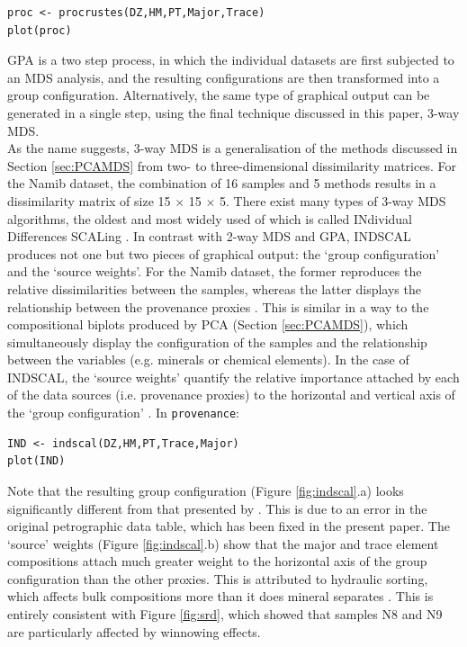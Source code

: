 \documentclass{article}
\begin{document}
\begin{verbatim}
proc <- procrustes(DZ,HM,PT,Major,Trace)
plot(proc)
\end{verbatim}

GPA is a two step process, in which the individual datasets are first
subjected to an MDS analysis, and the resulting configurations are
then transformed into a group configuration. Alternatively, the same
type of graphical output can be generated in a single step, using the
final technique discussed in this paper, 3-way MDS.\\

As the name suggests, 3-way MDS is a generalisation of the methods
discussed in Section \ref{sec:PCAMDS} from two- to three-dimensional
dissimilarity matrices.  For the Namib dataset, the combination of 16
samples and 5 methods results in a dissimilarity matrix of size 15
$\times$ 15 $\times$ 5. There exist many types of 3-way MDS
algorithms, the oldest and most widely used of which is called
INdividual Differences SCALing \citep[INDSCAL,][]{carroll1970}. In
contrast with 2-way MDS and GPA, INDSCAL produces not one but two
pieces of graphical output: the `group configuration' and the `source
weights'. For the Namib dataset, the former reproduces the relative
dissimilarities between the samples, whereas the latter displays the
relationship between the provenance proxies
\citep{vermeesch2015}. This is similar in a way to the compositional
biplots produced by PCA (Section \ref{sec:PCAMDS}), which
simultaneously display the configuration of the samples and the
relationship between the variables (e.g. minerals or chemical
elements).  In the case of INDSCAL, the `source weights' quantify the
relative importance attached by each of the data sources
(i.e. provenance proxies) to the horizontal and vertical axis of the
`group configuration' \citep{carroll1970, deleeuw2011, vermeesch2015}.
In {\tt provenance}:

\begin{verbatim}
IND <- indscal(DZ,HM,PT,Trace,Major)
plot(IND) 
\end{verbatim}

Note that the resulting group configuration (Figure
\ref{fig:indscal}.a) looks significantly different from that presented
by \citet{vermeesch2015}. This is due to an error in the original
petrographic data table, which has been fixed in the present
paper. The `source' weights (Figure \ref{fig:indscal}.b) show that the
major and trace element compositions attach much greater weight to the
horizontal axis of the group configuration than the other
proxies. This is attributed to hydraulic sorting, which affects bulk
compositions more than it does mineral separates
\citep{vermeesch2015}. This is entirely consistent with Figure
\ref{fig:srd}, which showed that samples N8 and N9 are particularly
affected by winnowing effects.
\end{document}
